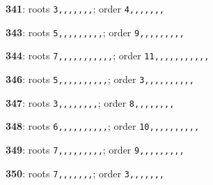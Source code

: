 \noindent \textbf{341}: roots \texttt{3,,,,,,,}; order \texttt{4,,,,,,,}\par
\noindent \textbf{343}: roots \texttt{5,,,,,,,,,}; order \texttt{9,,,,,,,,,}\par
\noindent \textbf{344}: roots \texttt{7,,,,,,,,,,,}; order \texttt{11,,,,,,,,,,,}\par
\noindent \textbf{346}: roots \texttt{5,,,,,,,,,,}; order \texttt{3,,,,,,,,,,}\par
\noindent \textbf{347}: roots \texttt{3,,,,,,,,}; order \texttt{8,,,,,,,,}\par
\noindent \textbf{348}: roots \texttt{6,,,,,,,,,,}; order \texttt{10,,,,,,,,,,}\par
\noindent \textbf{349}: roots \texttt{7,,,,,,,,,}; order \texttt{9,,,,,,,,,}\par
\noindent \textbf{350}: roots \texttt{7,,,,,,,}; order \texttt{3,,,,,,,}\par
